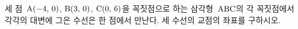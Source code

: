 세 점~$\mathrm{A}(-4,\mkern3mu 0)$, $\mathrm{B}(3,\mkern3mu 0)$, $\mathrm{C}(0,\mkern3mu 6)$을 꼭짓점으로 하는 삼각형~$\mathrm{ABC}$의 각 꼭짓점에서 각각의 대변에 그은 수선은 한 점에서 만난다. 세 수선의 교점의 좌표를 구하시오.
